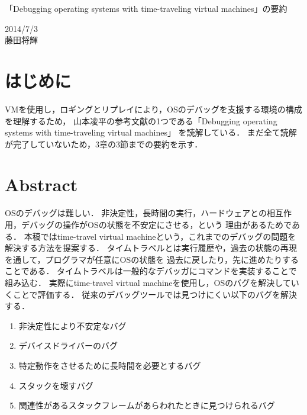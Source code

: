\documentclass[12pt]{jsarticle}
\begin{document}

\begin{center}
{\LARGE 「Debugging operating systems with time-traveling virtual machines」の要約}
\end{center}

\begin{flushright}
  2014/7/3\\
  藤田将輝
\end{flushright}
\section{はじめに}
VMを使用し，ロギングとリプレイにより，OSのデバッグを支援する環境の構成を理解するため，
山本凌平の参考文献の1つである「Debugging operating systems with time-traveling virtual machines」\cite{bib1}
を読解している．
まだ全て読解が完了していないため，3章の3節までの要約を示す．


\section{Abstract}
OSのデバッグは難しい．
非決定性，長時間の実行，ハードウェアとの相互作用，デバッグの操作がOSの状態を不安定にさせる，という
理由があるためである．
本稿ではtime-travel virtual machineという，これまでのデバッグの問題を解決する方法を提案する．
タイムトラベルとは実行履歴や，過去の状態の再現を通して，プログラマが任意にOSの状態を
過去に戻したり，先に進めたりすることである．
タイムトラベルは一般的なデバッガにコマンドを実装することで組み込む．
実際にtime-travel virtual machineを使用し，OSのバグを解決していくことで評価する．
従来のデバッグツールでは見つけにくい以下のバグを解決する．
\begin{enumerate}
\item 非決定性により不安定なバグ
\item デバイスドライバーのバグ
\item 特定動作をさせるために長時間を必要とするバグ
\item スタックを壊すバグ
\item 関連性があるスタックフレームがあらわれたときに見つけられるバグ
\end{enumerate}
\end{document}
